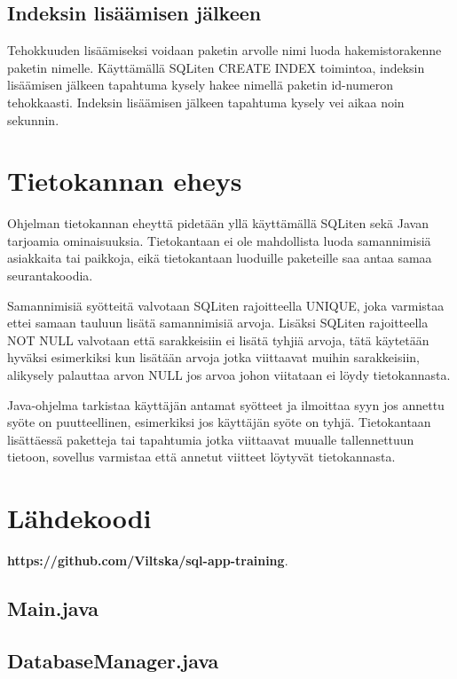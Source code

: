 \documentclass[11pt,a4paper]{article}
\begin{document}
\subsection*{Indeksin lisäämisen jälkeen}
Tehokkuuden lisäämiseksi voidaan paketin arvolle nimi luoda hakemistorakenne paketin nimelle. Käyttämällä SQLiten CREATE INDEX toimintoa, indeksin lisäämisen jälkeen tapahtuma kysely hakee nimellä paketin id-numeron tehokkaasti. Indeksin lisäämisen jälkeen tapahtuma kysely vei aikaa noin sekunnin.

\newpage
\section{Tietokannan eheys}
Ohjelman tietokannan eheyttä pidetään yllä käyttämällä SQLiten sekä Javan tarjoamia ominaisuuksia. Tietokantaan ei ole mahdollista luoda samannimisiä asiakkaita tai paikkoja, eikä tietokantaan luoduille paketeille saa antaa samaa seurantakoodia.

Samannimisiä syötteitä valvotaan SQLiten rajoitteella UNIQUE, joka varmistaa ettei samaan tauluun lisätä samannimisiä arvoja. Lisäksi SQLiten rajoitteella NOT NULL valvotaan että sarakkeisiin ei lisätä tyhjiä arvoja, tätä käytetään hyväksi esimerkiksi kun lisätään arvoja jotka viittaavat muihin sarakkeisiin, alikysely palauttaa arvon NULL jos arvoa johon viitataan ei löydy tietokannasta.
 
Java-ohjelma tarkistaa käyttäjän antamat syötteet ja ilmoittaa syyn jos annettu syöte on puutteellinen, esimerkiksi jos käyttäjän syöte on tyhjä. Tietokantaan lisättäessä paketteja tai tapahtumia jotka viittaavat muualle tallennettuun tietoon, sovellus varmistaa että annetut viitteet löytyvät tietokannasta.

\newpage
\section{Lähdekoodi}
\textbf{https://github.com/Viltska/sql-app-training}.

\subsection*{Main.java}

\subsection*{DatabaseManager.java}

\end{document}
